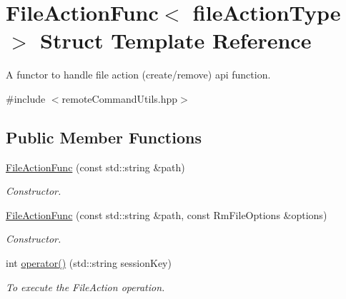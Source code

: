\hypertarget{structFileActionFunc}{
\section{FileActionFunc$<$ fileActionType $>$ Struct Template Reference}
\label{structFileActionFunc}
}


A functor to handle file action (create/remove) api function.  




{\ttfamily \#include $<$remoteCommandUtils.hpp$>$}

\subsection*{Public Member Functions}
\begin{DoxyCompactItemize}
\item 
\hyperlink{structFileActionFunc_acf8c606c21c91984a722a27a00fe8413}{FileActionFunc} (const std::string \&path)
\begin{DoxyCompactList}\small\item\em Constructor. \item\end{DoxyCompactList}\item 
\hyperlink{structFileActionFunc_a37b891b64e0b5e3d67870ff1f0a7289d}{FileActionFunc} (const std::string \&path, const RmFileOptions \&options)
\begin{DoxyCompactList}\small\item\em Constructor. \item\end{DoxyCompactList}\item 
int \hyperlink{structFileActionFunc_aa559e76fb78cf395ea13647f8f1d2cac}{operator()} (std::string sessionKey)
\begin{DoxyCompactList}\small\item\em To execute the FileAction operation. \item\end{DoxyCompactList}\end{DoxyCompactItemize}
